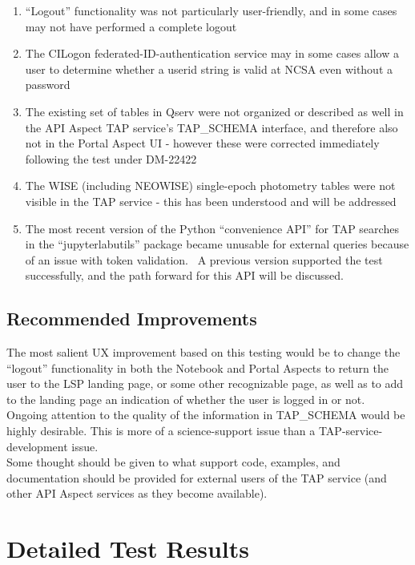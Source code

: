 \documentclass[DM,STR,toc]{lsstdoc}
\providecommand{\tightlist}{
  \setlength{\itemsep}{0pt}\setlength{\parskip}{0pt}}
\begin{document}
\begin{enumerate}
\tightlist
\item
  ``Logout'' functionality was not particularly user-friendly, and in
  some cases may not have performed a complete logout
\item
  The CILogon federated-ID-authentication service may in some cases
  allow a user to determine whether a userid string is valid at NCSA
  even without a password
\item
  The existing set of tables in Qserv were not organized or described as
  well in the API Aspect TAP service's TAP\_SCHEMA interface, and
  therefore also not in the Portal Aspect UI - however these were
  corrected immediately following the test under DM-22422
\item
  The WISE (including NEOWISE) single-epoch photometry tables were not
  visible in the TAP service - this has been understood and will be
  addressed
\item
  The most recent version of the Python ``convenience API'' for TAP
  searches in the ``jupyterlabutils'' package became unusable for
  external queries because of an issue with token validation. ~A
  previous version supported the test successfully, and the path forward
  for this API will be discussed.
\end{enumerate}


\subsection{Recommended Improvements}
\label{sect:recommendations}

The most salient UX improvement based on this testing would be to change
the ``logout'' functionality in both the Notebook and Portal Aspects to
return the user to the LSP landing page, or some other recognizable
page, as well as to add to the landing page an indication of whether the
user is logged in or not.\\[2\baselineskip]Ongoing attention to the
quality of the information in TAP\_SCHEMA would be highly desirable.
This is more of a science-support issue than a TAP-service-development
issue.\\[2\baselineskip]Some thought should be given to what support
code, examples, and documentation should be provided for external users
of the TAP service (and other API Aspect services as they become
available).~


\newpage
\section{Detailed Test Results}
\label{sect:detailedtestresults}
\end{document}
